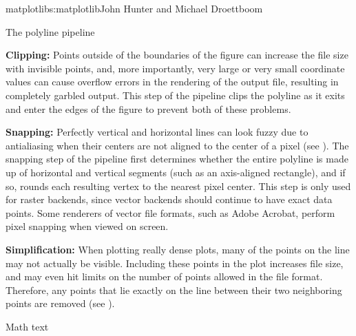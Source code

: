 \begin{aosachapter}{matplotlib}{s:matplotlib}{John Hunter and Michael Droettboom}
\begin{aosasect1}{The polyline pipeline}
\begin{aosaenumerate}
\item \textbf{Clipping:} Points outside of the boundaries of the
  figure can increase the file size with invisible points, and, more
  importantly, very large or very small coordinate values can cause
  overflow errors in the rendering of the output file, resulting in
  completely garbled output.  This step of the pipeline clips the
  polyline as it exits and enter the edges of the figure to prevent
  both of these problems.

\item \textbf{Snapping:} Perfectly vertical and horizontal lines can
  look fuzzy due to antialiasing when their centers are not aligned to
  the center of a pixel (see ).  The snapping step of the
  pipeline first determines whether the entire polyline is made up of
  horizontal and vertical segments (such as an axis-aligned
  rectangle), and if so, rounds each resulting vertex to the nearest
  pixel center.  This step is only used for raster backends, since
  vector backends should continue to have exact data points.  Some
  renderers of vector file formats, such as Adobe Acrobat, perform
  pixel snapping when viewed on screen.

\item \textbf{Simplification:} When plotting really dense plots, many
  of the points on the line may not actually be visible.  Including
  these points in the plot increases file size, and may even hit
  limits on the number of points allowed in the file format.
  Therefore, any points that lie exactly on the line between their two
  neighboring points are removed (see ).

\end{aosaenumerate}



\end{aosasect1}

\begin{aosasect1}{Math text}


\end{aosasect1}
\end{aosachapter}
